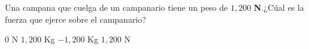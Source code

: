 
\question Una campana que cuelga de un campanario tiene un peso de $1,200$
          \textbf{N}.¿Cúal es la fuerza que ejerce sobre el campanario?

  \begin{oneparchoices}
    \choice $0$ N
    \choice $1,200$ Kg
    \choice $-1,200$ Kg
    \CorrectChoice $1,200$ N
  \end{oneparchoices}
  \answerline[D]
